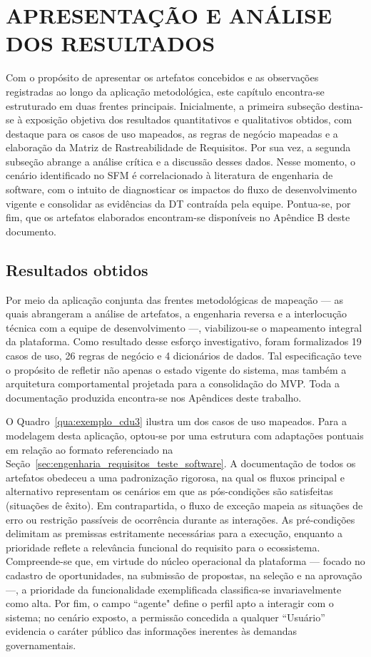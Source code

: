 \section{APRESENTAÇÃO E ANÁLISE DOS RESULTADOS}
\label{sec:apresentacao_analise_resultados}

Com o propósito de apresentar os artefatos concebidos e as observações registradas ao longo da aplicação metodológica, este capítulo encontra-se estruturado em duas frentes principais. Inicialmente, a primeira subseção destina-se à exposição objetiva dos resultados quantitativos e qualitativos obtidos, com destaque para os casos de uso mapeados, as regras de negócio mapeadas e a elaboração da Matriz de Rastreabilidade de Requisitos. Por sua vez, a segunda subseção abrange a análise crítica e a discussão desses dados. Nesse momento, o cenário identificado no SFM é correlacionado à literatura de engenharia de software, com o intuito de diagnosticar os impactos do fluxo de desenvolvimento vigente e consolidar as evidências da DT contraída pela equipe. Pontua-se, por fim, que os artefatos elaborados encontram-se disponíveis no Apêndice B deste documento.

\subsection{Resultados obtidos}
\label{sec:Resultados_Obtidos}

Por meio da aplicação conjunta das frentes metodológicas de mapeação — as quais abrangeram a análise de artefatos, a engenharia reversa e a interlocução técnica com a equipe de desenvolvimento —, viabilizou-se o mapeamento integral da plataforma. Como resultado desse esforço investigativo, foram formalizados 19 casos de uso, 26 regras de negócio e 4 dicionários de dados. Tal especificação teve o propósito de refletir não apenas o estado vigente do sistema, mas também a arquitetura comportamental projetada para a consolidação do MVP. Toda a documentação produzida encontra-se nos Apêndices deste trabalho.

O Quadro~\ref{qua:exemplo_cdu3} ilustra um dos casos de uso mapeados. Para a modelagem desta aplicação, optou-se por uma estrutura com adaptações pontuais em relação ao formato referenciado na Seção~\ref{sec:engenharia_requisitos_teste_software}. A documentação de todos os artefatos obedeceu a uma padronização rigorosa, na qual os fluxos principal e alternativo representam os cenários em que as pós-condições são satisfeitas (situações de êxito). Em contrapartida, o fluxo de exceção mapeia as situações de erro ou restrição passíveis de ocorrência durante as interações. As pré-condições delimitam as premissas estritamente necessárias para a execução, enquanto a prioridade reflete a relevância funcional do requisito para o ecossistema. Compreende-se que, em virtude do núcleo operacional da plataforma --- focado no cadastro de oportunidades, na submissão de propostas, na seleção e na aprovação ---, a prioridade da funcionalidade exemplificada classifica-se invariavelmente como alta. Por fim, o campo ``agente" define o perfil apto a interagir com o sistema; no cenário exposto, a permissão concedida a qualquer ``Usuário'' evidencia o caráter público das informações inerentes às demandas governamentais.
        
